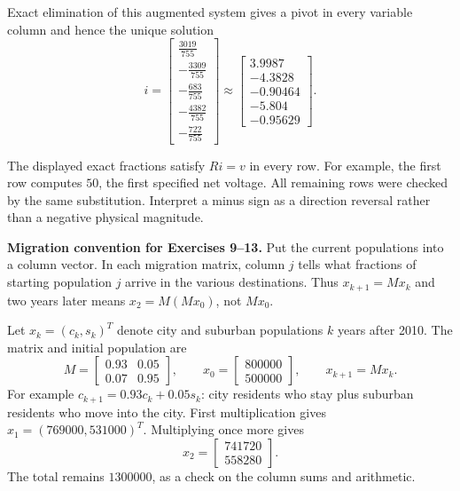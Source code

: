 Exact elimination of this augmented system gives a pivot in every variable column and hence the unique solution
\[ i=\begin{bmatrix}\frac{3019}{755}\\- \frac{3309}{755}\\- \frac{683}{755}\\- \frac{4382}{755}\\- \frac{722}{755}\end{bmatrix}\approx \begin{bmatrix}3.9987\\-4.3828\\-0.90464\\-5.804\\-0.95629\end{bmatrix}.\]

The displayed exact fractions satisfy $Ri=v$ in every row. For example, the first row computes $50$, the first specified net voltage. All remaining rows were checked by the same substitution. Interpret a minus sign as a direction reversal rather than a negative physical magnitude.


\textbf{Migration convention for Exercises 9--13.}
Put the current populations into a column vector. In each migration
matrix, column $j$ tells what fractions of starting population $j$
arrive in the various destinations. Thus $x_{k+1}=Mx_k$ and two
years later means $x_2=M(Mx_0)$, not $Mx_0$.

Let $x_k=(c_k,s_k)^T$ denote city and suburban populations $k$
years after 2010. The matrix and initial population are
\[
 M=\begin{bmatrix}0.93&0.05\\0.07&0.95\end{bmatrix},\qquad
 x_0=\begin{bmatrix}800000\\500000\end{bmatrix},\qquad x_{k+1}=Mx_k.
\]
For example $c_{k+1}=0.93c_k+0.05s_k$: city residents who stay
plus suburban residents who move into the city. First multiplication
gives $x_1=(769000,531000)^T$. Multiplying once more gives
\[
 x_2=\begin{bmatrix}741720\\558280\end{bmatrix}.
\]
The total remains $1300000$, as a check on the column sums and arithmetic.

